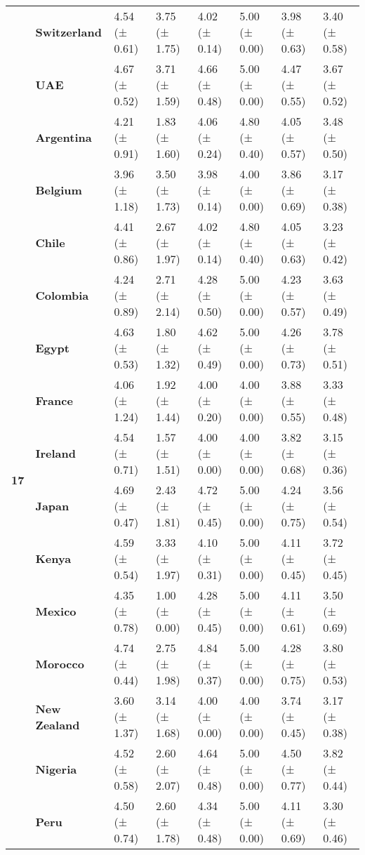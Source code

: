 \begin{tabular}{llllllll}
\textbf{} & \textbf{Switzerland} & 4.54 (± 0.61) & 3.75 (± 1.75) & 4.02 (± 0.14) & 5.00 (± 0.00) & 3.98 (± 0.63) & 3.40 (± 0.58) \\
\textbf{} & \textbf{UAE} & 4.67 (± 0.52) & 3.71 (± 1.59) & 4.66 (± 0.48) & 5.00 (± 0.00) & 4.47 (± 0.55) & 3.67 (± 0.52) \\
\cline{1-8}
\multirow[t]{19}{*}{\textbf{17}} & \textbf{Argentina} & 4.21 (± 0.91) & 1.83 (± 1.60) & 4.06 (± 0.24) & 4.80 (± 0.40) & 4.05 (± 0.57) & 3.48 (± 0.50) \\
\textbf{} & \textbf{Belgium} & 3.96 (± 1.18) & 3.50 (± 1.73) & 3.98 (± 0.14) & 4.00 (± 0.00) & 3.86 (± 0.69) & 3.17 (± 0.38) \\
\textbf{} & \textbf{Chile} & 4.41 (± 0.86) & 2.67 (± 1.97) & 4.02 (± 0.14) & 4.80 (± 0.40) & 4.05 (± 0.63) & 3.23 (± 0.42) \\
\textbf{} & \textbf{Colombia} & 4.24 (± 0.89) & 2.71 (± 2.14) & 4.28 (± 0.50) & 5.00 (± 0.00) & 4.23 (± 0.57) & 3.63 (± 0.49) \\
\textbf{} & \textbf{Egypt} & 4.63 (± 0.53) & 1.80 (± 1.32) & 4.62 (± 0.49) & 5.00 (± 0.00) & 4.26 (± 0.73) & 3.78 (± 0.51) \\
\textbf{} & \textbf{France} & 4.06 (± 1.24) & 1.92 (± 1.44) & 4.00 (± 0.20) & 4.00 (± 0.00) & 3.88 (± 0.55) & 3.33 (± 0.48) \\
\textbf{} & \textbf{Ireland} & 4.54 (± 0.71) & 1.57 (± 1.51) & 4.00 (± 0.00) & 4.00 (± 0.00) & 3.82 (± 0.68) & 3.15 (± 0.36) \\
\textbf{} & \textbf{Japan} & 4.69 (± 0.47) & 2.43 (± 1.81) & 4.72 (± 0.45) & 5.00 (± 0.00) & 4.24 (± 0.75) & 3.56 (± 0.54) \\
\textbf{} & \textbf{Kenya} & 4.59 (± 0.54) & 3.33 (± 1.97) & 4.10 (± 0.31) & 5.00 (± 0.00) & 4.11 (± 0.45) & 3.72 (± 0.45) \\
\textbf{} & \textbf{Mexico} & 4.35 (± 0.78) & 1.00 (± 0.00) & 4.28 (± 0.45) & 5.00 (± 0.00) & 4.11 (± 0.61) & 3.50 (± 0.69) \\
\textbf{} & \textbf{Morocco} & 4.74 (± 0.44) & 2.75 (± 1.98) & 4.84 (± 0.37) & 5.00 (± 0.00) & 4.28 (± 0.75) & 3.80 (± 0.53) \\
\textbf{} & \textbf{New Zealand} & 3.60 (± 1.37) & 3.14 (± 1.68) & 4.00 (± 0.00) & 4.00 (± 0.00) & 3.74 (± 0.45) & 3.17 (± 0.38) \\
\textbf{} & \textbf{Nigeria} & 4.52 (± 0.58) & 2.60 (± 2.07) & 4.64 (± 0.48) & 5.00 (± 0.00) & 4.50 (± 0.77) & 3.82 (± 0.44) \\
\textbf{} & \textbf{Peru} & 4.50 (± 0.74) & 2.60 (± 1.78) & 4.34 (± 0.48) & 5.00 (± 0.00) & 4.11 (± 0.69) & 3.30 (± 0.46) \\

\end{tabular}
